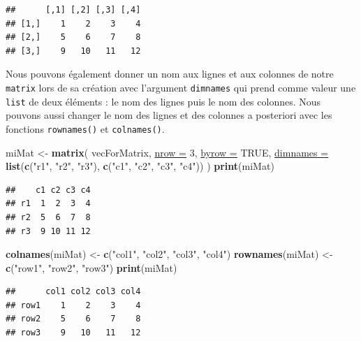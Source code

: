 \documentclass[twoside,symmetric]{book}
\newenvironment{Shaded}{}{}
\newcommand{\DataTypeTok}[1]{\underline{#1}}
\newcommand{\DecValTok}[1]{#1}
\newcommand{\KeywordTok}[1]{\textbf{#1}}
\newcommand{\NormalTok}[1]{#1}
\newcommand{\OtherTok}[1]{#1}
\newcommand{\StringTok}[1]{#1}
\begin{document}
\begin{verbatim}
##      [,1] [,2] [,3] [,4]
## [1,]    1    2    3    4
## [2,]    5    6    7    8
## [3,]    9   10   11   12
\end{verbatim}

Nous pouvons également donner un nom aux lignes et aux colonnes de notre \texttt{matrix} lors de sa création avec l'argument \texttt{dimnames} qui prend comme valeur une \texttt{list} de deux éléments : le nom des lignes puis le nom des colonnes. Nous pouvons aussi changer le nom des lignes et des colonnes a posteriori avec les fonctions \texttt{rownames()} et \texttt{colnames()}.

\begin{Shaded}
\begin{Highlighting}[]
\NormalTok{miMat <-}\StringTok{ }\KeywordTok{matrix}\NormalTok{(}
\NormalTok{  vecForMatrix, }
  \DataTypeTok{nrow =} \DecValTok{3}\NormalTok{, }
  \DataTypeTok{byrow =} \OtherTok{TRUE}\NormalTok{, }
  \DataTypeTok{dimnames =} \KeywordTok{list}\NormalTok{(}\KeywordTok{c}\NormalTok{(}\StringTok{"r1"}\NormalTok{, }\StringTok{"r2"}\NormalTok{, }\StringTok{"r3"}\NormalTok{), }\KeywordTok{c}\NormalTok{(}\StringTok{"c1"}\NormalTok{, }\StringTok{"c2"}\NormalTok{, }\StringTok{"c3"}\NormalTok{, }\StringTok{"c4"}\NormalTok{))}
\NormalTok{)}
\KeywordTok{print}\NormalTok{(miMat)}
\end{Highlighting}
\end{Shaded}

\begin{verbatim}
##    c1 c2 c3 c4
## r1  1  2  3  4
## r2  5  6  7  8
## r3  9 10 11 12
\end{verbatim}

\begin{Shaded}
\begin{Highlighting}[]
\KeywordTok{colnames}\NormalTok{(miMat) <-}\StringTok{ }\KeywordTok{c}\NormalTok{(}\StringTok{"col1"}\NormalTok{, }\StringTok{"col2"}\NormalTok{, }\StringTok{"col3"}\NormalTok{, }\StringTok{"col4"}\NormalTok{)}
\KeywordTok{rownames}\NormalTok{(miMat) <-}\StringTok{ }\KeywordTok{c}\NormalTok{(}\StringTok{"row1"}\NormalTok{, }\StringTok{"row2"}\NormalTok{, }\StringTok{"row3"}\NormalTok{)}
\KeywordTok{print}\NormalTok{(miMat)}
\end{Highlighting}
\end{Shaded}

\begin{verbatim}
##      col1 col2 col3 col4
## row1    1    2    3    4
## row2    5    6    7    8
## row3    9   10   11   12
\end{verbatim}
\end{document}
